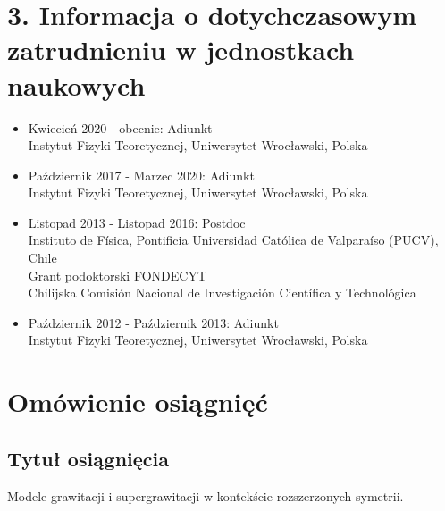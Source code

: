 \documentclass[12pt,a4paper]{article}
\begin{document}

\section{3.	Informacja o dotychczasowym zatrudnieniu w jednostkach naukowych}

\begin{itemize}
	\item Kwiecień 2020 - obecnie: Adiunkt\\
	Instytut Fizyki Teoretycznej, Uniwersytet Wrocławski, Polska
	
	\item Październik 2017 - Marzec 2020: Adiunkt\\
	Instytut Fizyki Teoretycznej, Uniwersytet Wrocławski, Polska
	
	\item Listopad 2013 - Listopad 2016: Postdoc\\
	Instituto de F\'{i}sica, Pontificia Universidad Cat\'{o}lica de Valpara\'{i}so (PUCV), Chile\\
	Grant podoktorski FONDECYT\\ 
	Chilijska Comisi\'{o}n Nacional de Investigaci\'{o}n Cient\'{i}fica y Technol\'{o}gica
	
	\item Październik 2012 - Październik 2013: Adiunkt\\
	Instytut Fizyki Teoretycznej, Uniwersytet Wrocławski, Polska
\end{itemize}


\section{Omówienie osiągnięć}

\subsection{Tytuł osiągnięcia} 

Modele grawitacji i supergrawitacji w kontekście rozszerzonych symetrii.
\end{document}
